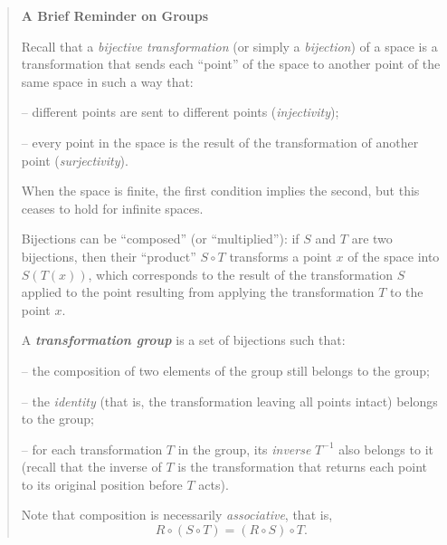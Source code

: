 \documentclass[11pt,a4paper]{article}
\begin{document}
\begin{quote}
\textbf{A Brief Reminder on Groups}

Recall that a \emph{bijective transformation} (or simply a \emph{bijection}) of a space is a transformation that sends each ``point'' 
of the space to another point of the same space in such a way that:

\vspace{0.1cm}   

--  different points are sent to different points (\emph{injectivity});

\vspace{0.1cm}   

-- every point in the space is the result of the transformation of another point (\emph{surjectivity}).

\vspace{0.1cm}

When the space is finite, the first condition implies the second, but this ceases to hold for infinite spaces.

Bijections can be ``composed'' (or ``multiplied''): if $S$ and $T$ are two bijections, then their ``product'' $S \circ T$ transforms 
a point $x$ of the space into $S(T(x))$, which corresponds to the result of the transformation $S$ applied to the point resulting 
from applying the transformation $T$ to the point $x$.

A \textbf{\em transformation group} is a set of bijections such that:

\vspace{0.1cm}   

-- the composition of two elements of the group still belongs to the group;
 
 \vspace{0.1cm}    
 
-- the \emph{identity} (that is, the transformation leaving all points intact) belongs to the group;
  
 \vspace{0.1cm}    
 
-- for each transformation $T$ in the group, its \emph{inverse} $T^{-1}$ also belongs to it (recall that the 
 inverse of $T$ is the transformation that returns each point to its original position before $T$ acts).

\vspace{0.1cm}

Note that composition is necessarily \emph{associative}, that is,
$$R \circ (S \circ T) = (R \circ S) \circ T.$$


\end{quote}
\end{document}
